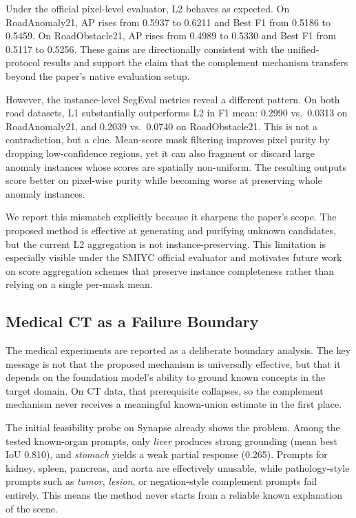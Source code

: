\documentclass[a4paper,fleqn]{cas-dc}
\begin{document}
Under the official pixel-level evaluator, L2 behaves as expected. On RoadAnomaly21, AP rises from 0.5937 to 0.6211 and Best F1 from 0.5186 to 0.5459. On RoadObstacle21, AP rises from 0.4989 to 0.5330 and Best F1 from 0.5117 to 0.5256. These gains are directionally consistent with the unified-protocol results and support the claim that the complement mechanism transfers beyond the paper's native evaluation setup.

However, the instance-level SegEval metrics reveal a different pattern. On both road datasets, L1 substantially outperforms L2 in F1 mean: 0.2990 vs.\ 0.0313 on RoadAnomaly21, and 0.2039 vs.\ 0.0740 on RoadObstacle21. This is not a contradiction, but a clue. Mean-score mask filtering improves pixel purity by dropping low-confidence regions, yet it can also fragment or discard large anomaly instances whose scores are spatially non-uniform. The resulting outputs score better on pixel-wise purity while becoming worse at preserving whole anomaly instances.

We report this mismatch explicitly because it sharpens the paper's scope. The proposed method is effective at generating and purifying unknown candidates, but the current L2 aggregation is not instance-preserving. This limitation is especially visible under the SMIYC official evaluator and motivates future work on score aggregation schemes that preserve instance completeness rather than relying on a single per-mask mean.

\subsection{Medical CT as a Failure Boundary}
\label{sec:exp:medical}

The medical experiments are reported as a deliberate boundary analysis. The key message is not that the proposed mechanism is universally effective, but that it depends on the foundation model's ability to ground known concepts in the target domain. On CT data, that prerequisite collapses, so the complement mechanism never receives a meaningful known-union estimate in the first place.

The initial feasibility probe on Synapse already shows the problem. Among the tested known-organ prompts, only \textit{liver} produces strong grounding (mean best IoU 0.810), and \textit{stomach} yields a weak partial response (0.265). Prompts for kidney, spleen, pancreas, and aorta are effectively unusable, while pathology-style prompts such as \textit{tumor}, \textit{lesion}, or negation-style complement prompts fail entirely. This means the method never starts from a reliable known explanation of the scene.
\end{document}

